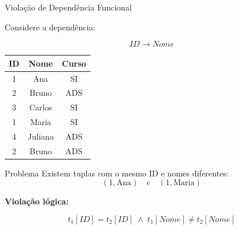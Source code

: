 \documentclass[9pt]{beamer}
\begin{document}
\begin{frame}{Violação de Dependência Funcional}

\small

Considere a dependência:

\[
ID \rightarrow Nome
\]

\vspace{0.3cm}

\centering
\begin{tabular}{|c|c|c|}
\hline
ID & Nome & Curso \\ \hline
1 & Ana & SI \\ \hline
2 & Bruno & ADS \\ \hline
3 & Carlos & SI \\ \hline
1 & Maria & SI \\ \hline
4 & Juliana & ADS \\ \hline
2 & Bruno & ADS \\ \hline
\end{tabular}

\vspace{0.4cm}

\begin{alertblock}{Problema}
Existem tuplas com o mesmo ID e nomes diferentes:
\[
(1, \text{Ana}) \quad e \quad (1, \text{Maria})
\]
\end{alertblock}

\vspace{0.3cm}

\textbf{Violação lógica:}

\[
t_1[ID] = t_2[ID] \;\land\; t_1[Nome] \neq t_2[Nome]
\]

\end{frame}
\end{document}
